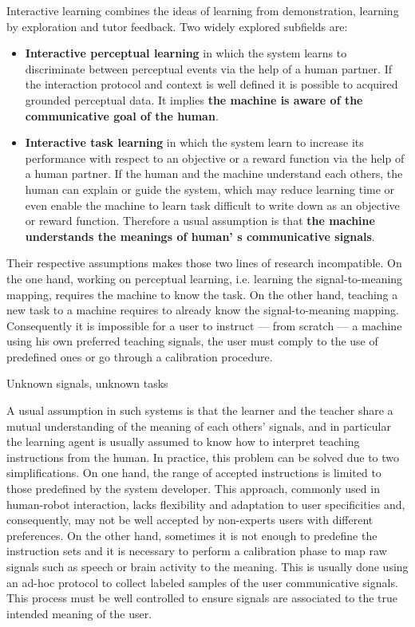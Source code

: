 Interactive learning combines the ideas of learning from demonstration, learning by exploration and tutor feedback. Two widely explored subfields are:
\begin{itemize}
\item \textbf{Interactive perceptual learning} in which the system learns to discriminate between perceptual events via the help of a human partner. If the interaction protocol and context is well defined it is possible to acquired grounded perceptual data. It implies \textbf{the machine is aware of the communicative goal of the human}.
\item \textbf{Interactive task learning} in which the system learn to increase its performance with respect to an objective or a reward function via the help of a human partner. If the human and the machine understand each others, the human can explain or guide the system, which may reduce learning time or even enable the machine to learn task difficult to write down as an objective or reward function. Therefore a usual assumption is that \textbf{the machine understands the meanings of human' s  communicative signals}.
\end{itemize}

Their respective assumptions makes those two lines of research incompatible. On the one hand, working on perceptual learning, i.e. learning the signal-to-meaning mapping, requires the machine to know the task. On the other hand, teaching a new task to a machine requires to already know the signal-to-meaning mapping. Consequently it is impossible for a user to instruct --- from scratch --- a machine using his own preferred teaching signals, the user must comply to the use of predefined ones or go through a calibration procedure.

Unknown signals, unknown tasks

A usual assumption in such systems is that the learner and the teacher share a mutual understanding of the meaning of each others' signals, and in particular the learning agent is usually assumed to know how to interpret teaching instructions from the human. In practice, this problem can be solved due to two simplifications. On one hand, the range of accepted instructions is limited to those predefined by the system developer. This approach, commonly used in human-robot interaction, lacks flexibility and adaptation to user specificities and, consequently, may not be well accepted by non-experts users with different preferences. 
%
On the other hand, sometimes it is not enough to predefine the instruction sets and it is necessary to perform a calibration phase to map raw signals such as speech or brain activity to the meaning. This is usually done using an ad-hoc protocol to collect labeled samples of the user communicative signals. This process must be well controlled to ensure signals are associated to the true intended meaning of the user.

